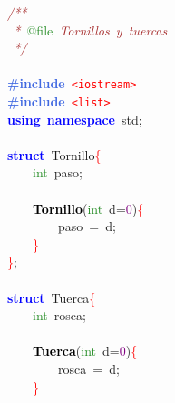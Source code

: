 \noindent
\mbox{}\textit{\textcolor{Brown}{/**}} \\
\mbox{}\textit{\textcolor{Brown}{\ *\ }}\textcolor{ForestGreen}{@file}\textit{\textcolor{Brown}{\ Tornillos\ y\ tuercas}} \\
\mbox{}\textit{\textcolor{Brown}{\ */}} \\
\mbox{} \\
\mbox{}\textbf{\textcolor{RoyalBlue}{\#include}}\ \texttt{\textcolor{Red}{\textless{}iostream\textgreater{}}} \\
\mbox{}\textbf{\textcolor{RoyalBlue}{\#include}}\ \texttt{\textcolor{Red}{\textless{}list\textgreater{}}} \\
\mbox{}\textbf{\textcolor{Blue}{using}}\ \textbf{\textcolor{Blue}{namespace}}\ std\textcolor{BrickRed}{;} \\
\mbox{} \\
\mbox{}\textbf{\textcolor{Blue}{struct}}\ \textcolor{TealBlue}{Tornillo}\textcolor{Red}{\{} \\
\mbox{}\ \ \ \ \textcolor{ForestGreen}{int}\ paso\textcolor{BrickRed}{;} \\
\mbox{} \\
\mbox{}\ \ \ \ \textbf{\textcolor{Black}{Tornillo}}\textcolor{BrickRed}{(}\textcolor{ForestGreen}{int}\ d\textcolor{BrickRed}{=}\textcolor{Purple}{0}\textcolor{BrickRed}{)}\textcolor{Red}{\{} \\
\mbox{}\ \ \ \ \ \ \ \ paso\ \textcolor{BrickRed}{=}\ d\textcolor{BrickRed}{;} \\
\mbox{}\ \ \ \ \textcolor{Red}{\}} \\
\mbox{}\textcolor{Red}{\}}\textcolor{BrickRed}{;} \\
\mbox{} \\
\mbox{}\textbf{\textcolor{Blue}{struct}}\ \textcolor{TealBlue}{Tuerca}\textcolor{Red}{\{} \\
\mbox{}\ \ \ \ \textcolor{ForestGreen}{int}\ rosca\textcolor{BrickRed}{;} \\
\mbox{} \\
\mbox{}\ \ \ \ \textbf{\textcolor{Black}{Tuerca}}\textcolor{BrickRed}{(}\textcolor{ForestGreen}{int}\ d\textcolor{BrickRed}{=}\textcolor{Purple}{0}\textcolor{BrickRed}{)}\textcolor{Red}{\{} \\
\mbox{}\ \ \ \ \ \ \ \ rosca\ \textcolor{BrickRed}{=}\ d\textcolor{BrickRed}{;} \\
\mbox{}\ \ \ \ \textcolor{Red}{\}} \\
